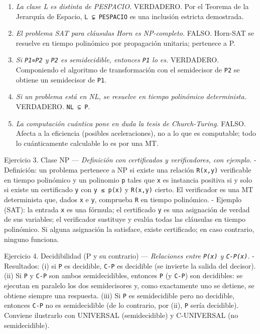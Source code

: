 \documentclass[12pt]{book} %
\providecommand{\tightlist}{%
  \setlength{\itemsep}{0pt}\setlength{\parskip}{0pt}}
\begin{document}
\begin{enumerate}
\def\labelenumi{\arabic{enumi}.}
\tightlist
\item
  \emph{La clase L es distinta de PESPACIO.} VERDADERO. Por el Teorema
  de la Jerarquía de Espacio, \texttt{L\ ⊊\ PESPACIO} es una inclusión
  estricta demostrada.
\item
  \emph{El problema SAT para cláusulas Horn es NP-completo.} FALSO.
  Horn-SAT se resuelve en tiempo polinómico por propagación unitaria;
  pertenece a P.
\item
  \emph{Si \texttt{P1∝P2} y \texttt{P2} es semidecidible, entonces
  \texttt{P1} lo es.} VERDADERO. Componiendo el algoritmo de
  transformación con el semidecisor de \texttt{P2} se obtiene un
  semidecisor de \texttt{P1}.
\item
  \emph{Si un problema está en NL, se resuelve en tiempo polinómico
  determinista.} VERDADERO. \texttt{NL\ ⊆\ P}.
\item
  \emph{La computación cuántica pone en duda la tesis de Church-Turing.}
  FALSO. Afecta a la eficiencia (posibles aceleraciones), no a lo que es
  computable; todo lo cuánticamente calculable lo es por una MT.
\end{enumerate}

Ejercicio 3. Clase NP --- \emph{Definición con certificados y
verificadores, con ejemplo.} - Definición: un problema pertenece a NP si
existe una relación \texttt{R(x,y)} verificable en tiempo polinómico y
un polinomio \texttt{p} tales que \texttt{x} es instancia positiva si y
solo si existe un certificado \texttt{y} con
\texttt{\textbar{}y\textbar{}\ ≤\ p(\textbar{}x\textbar{})} y
\texttt{R(x,y)} cierto. El verificador es una MT determinista que, dados
\texttt{x} e \texttt{y}, comprueba \texttt{R} en tiempo polinómico. -
Ejemplo (SAT): la entrada \texttt{x} es una fórmula; el certificado
\texttt{y} es una asignación de verdad de sus variables; el verificador
sustituye y evalúa todas las cláusulas en tiempo polinómico. Si alguna
asignación la satisface, existe certificado; en caso contrario, ninguno
funciona.

Ejercicio 4. Decidibilidad (P y su contrario) --- \emph{Relaciones entre
\texttt{P(x)} y \texttt{C-P(x)}.} - Resultados: (i) si \texttt{P} es
decidible, \texttt{C-P} es decidible (se invierte la salida del
decisor). (ii) Si \texttt{P} y \texttt{C-P} son ambos semidecidibles,
entonces \texttt{P} (y \texttt{C-P}) son decidibles: se ejecutan en
paralelo los dos semidecisores y, como exactamente uno se detiene, se
obtiene siempre una respuesta. (iii) Si \texttt{P} es semidecidible pero
no decidible, entonces \texttt{C-P} no es semidecidible (de lo
contrario, por (ii), \texttt{P} sería decidible). Conviene ilustrarlo
con UNIVERSAL (semidecidible) y C-UNIVERSAL (no semidecidible).
\end{document}

